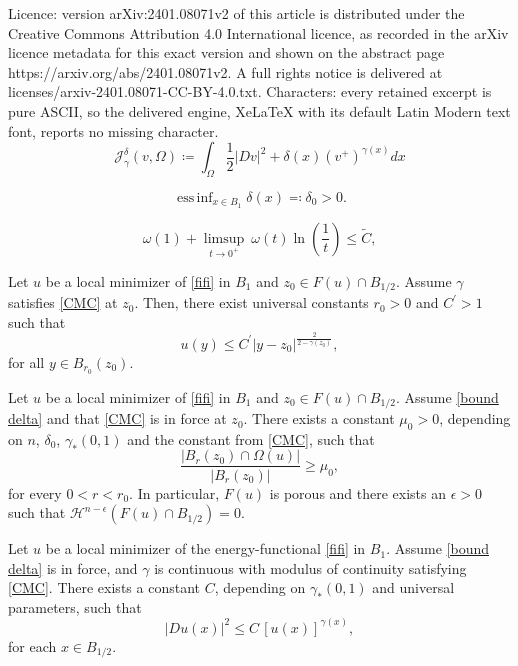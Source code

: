 \documentclass[10pt,a4paper]{amsart}
\DeclareMathOperator*{\ess}{ess\,}
\begin{document}
Licence: version arXiv:2401.08071v2 of this article is distributed under the Creative Commons Attribution 4.0 International licence, as recorded in the arXiv licence metadata for this exact version and shown on the abstract page https://arxiv.org/abs/2401.08071v2. A full rights notice is delivered at licenses/arxiv-2401.08071-CC-BY-4.0.txt. Characters: every retained excerpt is pure ASCII, so the delivered engine, XeLaTeX with its default Latin Modern text font, reports no missing character.
\begin{equation}\label{fifi}
	\mathcal{J}^\delta_\gamma(v, \Omega) \coloneqq  \int_{\Omega} \frac{1}{2} \left| Dv \right|^2 + \delta(x) (v^+)^{\gamma(x)} dx
\end{equation}

\begin{equation}\label{bound delta}
	 \mathop{\ess \inf}_{x\in B_1} \delta(x) \eqqcolon \delta_0>0. 
\end{equation} 

\begin{equation}\label{CMC}
	\omega(1) + \limsup_{t\to 0^+} \ \omega(t) \ln \left( \frac{1}{t} \right ) \le \tilde{C},
\end{equation}

\begin{theorem}\label{thm-beicodebode}
	Let $u$ be a local minimizer of \eqref{fifi} in $B_1$ and $z_0 \in F(u) \cap B_{1/2}$. Assume $\gamma$ satisfies \eqref{CMC} at $z_0$. 
Then, there exist universal constants $r_0>0$ and $C^\prime>1$ such that
\begin{equation}\label{thm}
		 u(y)\leq C^\prime \left |y-z_0 \right |^{\frac{2}{2-\gamma(z_0)}},
	\end{equation}
for all $y \in B_{r_0}(z_0)$.
\end{theorem}

\begin{theorem}\label{pos_density} Let $u$ be a local minimizer of \eqref{fifi} in $B_1$ and $z_0 \in F(u) \cap B_{1/2}$. Assume \eqref{bound delta} and that \eqref{CMC} is in force at $z_0$. There exists a constant $\mu_0 > 0$, depending on $n$, $\delta_0$, $\gamma_\ast (0,1)$ and the constant from \eqref{CMC}, such that
$$
	\frac{\left |B_r(z_0) \cap \Omega(u) \right |}{\left |B_r(z_0) \right |} \ge \mu_0,
$$
for every $0<r<r_0.$ In particular, $F(u)$ is porous and there exists an $\epsilon>0$ such that $\mathcal{H}^{n-\epsilon}(F(u) \cap B_{1/2}) = 0$.
\end{theorem}

\begin{lemma}\label{opt pt grad estimate} 
Let $u$ be a local minimizer of the energy-functional \eqref{fifi} in $B_1$. Assume \eqref{bound delta} is in force, and $\gamma$ is continuous with modulus of continuity satisfying \eqref{CMC}. There exists a constant $C$, depending on $\gamma_\ast (0,1)$ and universal parameters, such that
\begin{equation}\nonumber
|Du(x)|^2 \le C\, [u(x)]^{\gamma(x)},
\end{equation}
for each $x \in B_{1/2}$.
\end{lemma}
\end{document}
